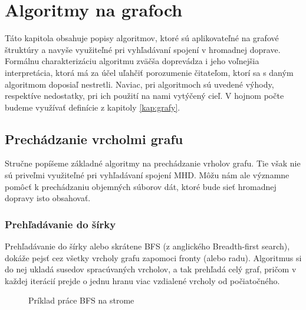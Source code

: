 \chapter{Algoritmy na grafoch}
\label{kap:algoritmy}

Táto kapitola obsahuje popisy algoritmov, ktoré sú aplikovateľné na grafové štruktúry a navyše využiteľné pri vyhľadávaní spojení v hromadnej doprave. Formálnu charakterizáciu algoritmu zväčša doprevádza i jeho voľnejšia interpretácia, ktorá má za účel uľahčiť porozumenie čitateľom, ktorí sa s daným algoritmom doposiaľ nestretli. Naviac, pri algoritmoch sú uvedené výhody, respektíve nedostatky, pri ich použití na nami vytýčený cieľ. V hojnom počte budeme využívať definície z kapitoly \ref{kap:grafy}.\newline


\section{Prechádzanie vrcholmi grafu}

Stručne popíšeme základné algoritmy na prechádzanie vrholov grafu. Tie však nie sú priveľmi využiteľné pri vyhľadávaní spojení MHD. Môžu nám ale významne pomôcť k prechádzaniu objemných súborov dát, ktoré bude sieť hromadnej dopravy isto obsahovať.\newline


\subsection{Prehľadávanie do šírky}

Prehľadávanie do šírky alebo skrátene BFS (z anglického Breadth-first search), dokáže pejsť cez všetky vrcholy grafu zapomoci fronty (alebo radu). Algoritmus si do nej ukladá susedov spracúvaných vrcholov, a tak prehľadá celý graf, pričom v každej iterácií prejde o jednu hranu viac vzdialené vrcholy od počiatočného.\newline

\begin{figure}[H]
  \caption{Príklad práce BFS na strome}
  \label{BFS_priklad}
\end{figure}


